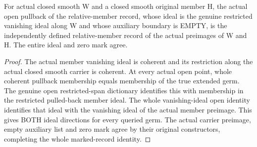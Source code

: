 \begin{theorem}
\label{hir:sharp-original-relative-member-initial-open-record}
\leanok
For actual closed smooth W and a closed smooth original member H, the actual
open pullback of the relative-member record, whose ideal is the genuine
restricted vanishing ideal along W and whose auxiliary boundary is EMPTY,
is the independently defined relative-member record of the actual preimages
of W and H. The entire ideal and zero mark agree.
\end{theorem}
\begin{proof}
The actual member vanishing ideal is coherent and its restriction along the
actual closed smooth carrier is coherent. At every actual open point, whole
coherent pullback membership equals membership of the true extended germ.
The genuine open restricted-span dictionary identifies this with membership
in the restricted pulled-back member ideal. The whole vanishing-ideal open
identity identifies that ideal with the vanishing ideal of the actual member
preimage. This gives BOTH ideal directions for every queried germ. The actual
carrier preimage, empty auxiliary list and zero mark agree by their original
constructors, completing the whole marked-record identity.
\end{proof}

